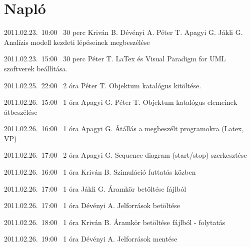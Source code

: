 %
\section{Napló}

\begin{naplo}

\bejegyzes
{2011.02.23.~10:00~} %
{30 perc} %
{Kriván B. \newline
Dévényi A. \newline
Péter T. \newline
Apagyi G. \newline
Jákli G.} %
{Analízis modell kezdeti lépéseinek megbeszélése} %

\bejegyzes
{2011.02.23.~15:00~}
{30 perc}
{Péter T.}
{LaTex és Visual Paradigm for UML szoftverek beállítása.}

\bejegyzes
{2011.02.25.~22:00~} %
{2 óra} %
{Péter T.} %
{Objektum katalógus kitöltése.} %

\bejegyzes
{2011.02.26.~15:00~} %
{1 óra} %
{Apagyi G. \newline
Péter T.} %
{Objektum katalógus elemeinek átbeszélése} %


\bejegyzes
{2011.02.26.~16:00~} %
{1 óra} %
{Apagyi G.} %
{Átállás a megbeszélt programokra (Latex, VP)} %

\bejegyzes
{2011.02.26.~17:00~} %
{2 óra} %
{Apagyi G.} %
{Sequence diagram (start/stop) szerkesztése} %


\bejegyzes
{2011.02.26.~16:00~} %
{1 óra} %
{Kriván B.} %
{Szimuláció futtatás közben} %

\bejegyzes
{2011.02.26.~17:00~} %
{1 óra} %
{Jákli G.} %
{Áramkör betöltése fájlból} %

\bejegyzes
{2011.02.26.~17:00~} %
{1 óra} %
{Dévényi A.} %
{Jelforrások betöltése} %


\bejegyzes
{2011.02.26.~18:00~} %
{1 óra} %
{Kriván B.} %
{Áramkör betöltése fájlból - folytatás} %

\bejegyzes
{2011.02.26.~19:00~} %
{1 óra} %
{Dévényi A.} %
{Jelforrások mentése} %


\end{naplo}
